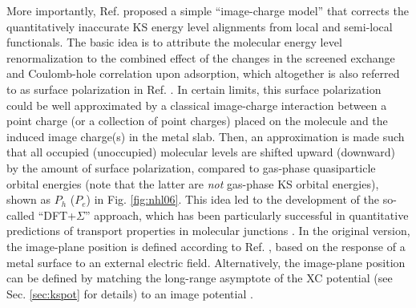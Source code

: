 \documentclass[aip, amsmath, amssymb, reprint, longbibliography]{revtex4-2}
\begin{document}
More importantly, Ref.  proposed a simple ``image-charge model'' that corrects the quantitatively inaccurate KS energy level alignments from local and semi-local functionals. The basic idea is to attribute the molecular energy level renormalization to the combined effect of the changes in the screened exchange and Coulomb-hole correlation upon adsorption, which altogether is also referred to as surface polarization in Ref. . In certain limits, this surface polarization could be well approximated by a classical image-charge interaction between a point charge (or a collection of point charges) placed on the molecule and the induced image charge(s) in the metal slab. Then, an approximation is made such that all occupied (unoccupied) molecular levels are shifted upward (downward) by the amount of surface polarization, compared to gas-phase quasiparticle orbital energies (note that the latter are \emph{not} gas-phase KS orbital energies), shown as $P_h$ ($P_e$) in Fig. \ref{fig:nhl06}. This idea led to the development of the so-called ``DFT+$\Sigma$'' approach, which has been particularly successful in quantitative predictions of transport properties in molecular junctions \cite{QVCL07,LWYA14}. In the original version, the image-plane position is defined according to Ref. , based on the response of a metal surface to an external electric field\cite{LK73}. Alternatively, the image-plane position can be defined by matching the long-range asymptote of the XC potential (see Sec. \ref{sec:kspot} for details) to an image potential \cite{LLG09,ELNK15}.
\end{document}
